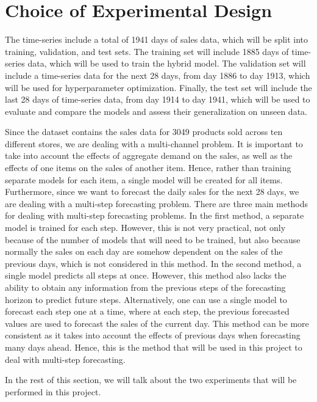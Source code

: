 \section{Choice of Experimental Design}
The time-series include a total of 1941 days of sales data, which will be split into training, validation, and test sets. 
The training set will include 1885 days of time-series data, which will be used to train the hybrid model.
The validation set will include a time-series data for the next 28 days, from day 1886 to day 1913, which will be used for hyperparameter optimization.
Finally, the test set will include the last 28 days of time-series data, from day 1914 to day 1941, which will be used to evaluate and compare the models and assess their generalization on unseen data. 

Since the dataset contains the sales data for 3049 products sold across ten different stores, we are dealing with a multi-channel problem. 
It is important to take into account the effects of aggregate demand on the sales, as well as the effects of one items on the sales of another item.
Hence, rather than training separate models for each item, a single model will be created for all items.
Furthermore, since we want to forecast the daily sales for the next 28 days, we are dealing with a multi-step forecasting problem. 
There are three main methods for dealing with multi-step forecasting problems.
In the first method, a separate model is trained for each step. 
However, this is not very practical, not only because of the number of models that will need to be trained, but also because normally the sales on each day are somehow dependent on the sales of the previous days, which is not considered in this method.
In the second method, a single model predicts all steps at once.
However, this method also lacks the ability to obtain any information from the previous steps of the forecasting horizon to predict future steps.
Alternatively, one can use a single model to forecast each step one at a time, where at each step, the previous forecasted values are used to forecast the sales of the current day.
This method can be more consistent as it takes into account the effects of previous days when forecasting many days ahead.
Hence, this is the method that will be used in this project to deal with multi-step forecasting.

In the rest of this section, we will talk about the two experiments that will be performed in this project.

